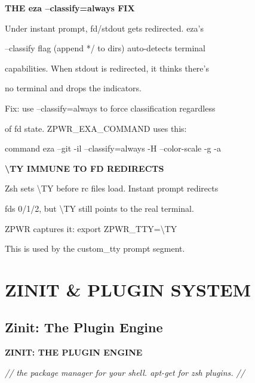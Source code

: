 \documentclass[11pt,a4paper,twoside]{book}
\begin{document}
\vspace{12pt}
{\bfseries\color{neonyellow} THE eza --classify=always FIX}\vspace{4pt}

Under instant prompt, fd/stdout gets redirected. eza's

--classify flag (append */ to dirs) auto-detects terminal

capabilities. When stdout is redirected, it thinks there's

no terminal and drops the indicators.

Fix: use --classify=always to force classification regardless

of fd state. ZPWR\_EXA\_COMMAND uses this:

\begin{codebox}
command eza --git -il --classify=always -H --color-scale -g -a\\
\end{codebox}


\vspace{12pt}
{\bfseries\color{neonyellow} \textbackslash{}TY IMMUNE TO FD REDIRECTS}\vspace{4pt}

Zsh sets \textbackslash{}TY before rc files load. Instant prompt redirects

fds 0/1/2, but \textbackslash{}TY still points to the real terminal.

\begin{codebox}
ZPWR captures it: export ZPWR\_TTY=\textbackslash{}TY\\
\end{codebox}

This is used by the custom\_tty prompt segment.


\vspace{16pt}


\chapter{ZINIT \& PLUGIN SYSTEM}

\section{Zinit: The Plugin Engine}


\vspace{10pt}
{\large\bfseries\color{neoncyan} ZINIT: THE PLUGIN ENGINE}\vspace{6pt}

{\small\itshape\color{dimtext} // the package manager for your shell. apt-get for zsh plugins. //}
\end{document}
